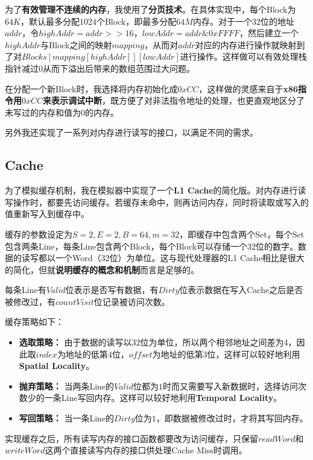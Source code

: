 为了{\bf 有效管理不连续的内存}，我使用了{\bf 分页技术}。在具体实现中，每个Block为$64K$，默认最多分配$1024$个Block，即最多分配$64M$内存。对于一个$32$位的地址$addr$，令$highAddr = addr >> 16$，$lowAddr = addr \& 0xFFFF$，然后建立一个$highAddr$与Block之间的映射$mapping$，从而对$addr$对应的内存进行操作就映射到了对$Blocks[mapping[highAddr]][lowAddr]$进行操作。这样做可以有效处理栈指针减过$0$从而下溢出后带来的数组范围过大问题。

在分配一个新Block时，我选择将内存初始化成$0xCC$，这样做的灵感来自于{\bf x86指令用$0xCC$来表示调试中断}，既方便了对非法指令地址的处理，也更直观地区分了未写过的内存和值为$0$的内存。

另外我还实现了一系列对内存进行读写的接口，以满足不同的需求。

\subsection{Cache}

为了模拟缓存机制，我在模拟器中实现了一个{\bf L1 Cache}的简化版。对内存进行读写操作时，都要先访问缓存。若缓存未命中，则再访问内存，同时将读取或写入的值重新写入到缓存中。

缓存的参数设定为$S = 2, E = 2, B = 64, m = 32$，即缓存中包含两个Set，每个Set包含两条Line，每条Line包含两个Block，每个Block可以存储一个$32$位的数字。数据的读写都以一个Word（$32$位）为单位。这与现代处理器的L1 Cache相比是很大的简化，但就{\bf 说明缓存的概念和机制}而言是足够的。

每条Line有$Valid$位表示是否写有数据，有$Dirty$位表示数据在写入Cache之后是否被修改过，有$countVisit$位记录被访问次数。

缓存策略如下：

\begin{itemize}
\item {\bf 选取策略：} 由于数据的读写以$32$位为单位，所以两个相邻地址之间差为$4$，因此取$index$为地址的低第$4$位，$offset$为地址的低第$3$位，这样可以较好地利用{\bf Spatial Locality}。
\item {\bf 抛弃策略：} 当两条Line的$Valid$位都为$1$时而又需要写入新数据时，选择访问次数少的一条Line写回内存。这样可以较好地利用{\bf Temporal Locality}。
\item {\bf 写回策略：} 当一条Line的$Dirty$位为$1$，即数据被修改过时，才将其写回内存。
\end{itemize}

实现缓存之后，所有读写内存的接口函数都要改为访问缓存，只保留$readWord$和$writeWord$这两个直接读写内存的接口供处理Cache Miss时调用。

